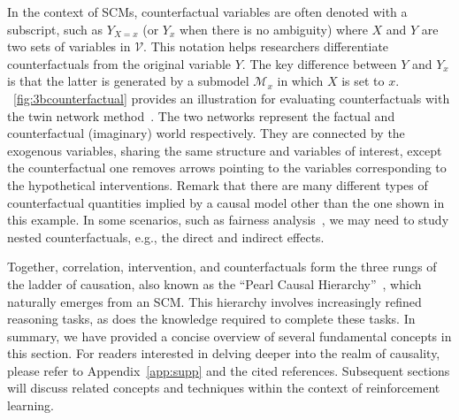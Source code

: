 \documentclass[10pt]{article} %
\theoremstyle{definition}
\begin{document}
In the context of SCMs, counterfactual variables are often denoted with a subscript, such as $Y_{X=x}$ (or $Y_x$ when there is no ambiguity) where $X$ and $Y$ are two sets of variables in $\mathcal{V}$. 
This notation helps researchers differentiate counterfactuals from the original variable $Y$. 
The key difference between $Y$ and $Y_x$ is that the latter is generated by a submodel $\mathcal{M}_x$ in which $X$ is set to $x$. \figurename~\ref{fig:3bcounterfactual} provides an illustration for evaluating counterfactuals with the twin network method~\citep[Chapter~7]{pearlCausality2009}. 
The two networks represent the factual and counterfactual (imaginary) world respectively. They are connected by the exogenous variables, sharing the same structure and variables of interest, except the counterfactual one removes arrows pointing to the variables corresponding to the hypothetical interventions.
Remark that there are many different types of counterfactual quantities implied by a causal model other than the one shown in this example. 
In some scenarios, such as fairness analysis~\citep{careyCausalFairnessField2022,pleckoCausalFairnessAnalysis2022}, we may need to study nested counterfactuals, e.g., the direct and indirect effects.

Together, correlation, intervention, and counterfactuals form the three rungs of the ladder of causation, also known as the ``Pearl Causal Hierarchy''~\citep{bareinboimPearlHierarchyFoundations2022}, which naturally emerges from an SCM. This hierarchy involves increasingly refined reasoning tasks, as does the knowledge required to complete these tasks. In summary, we have provided a concise overview of several fundamental concepts in this section. For readers interested in delving deeper into the realm of causality, please refer to Appendix~\ref{app:supp} and the cited references. Subsequent sections will discuss related concepts and techniques within the context of reinforcement learning.
\end{document}
